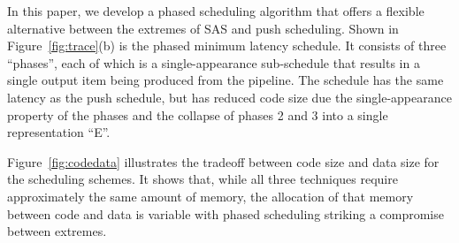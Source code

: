 In this paper, we develop a phased scheduling algorithm that offers a
flexible alternative between the extremes of SAS and push scheduling.
Shown in Figure~\ref{fig:trace}(b) is the phased minimum latency
schedule.  It consists of three ``phases'', each of which is a
single-appearance sub-schedule that results in a single output item
being produced from the pipeline.  The schedule has the same latency
as the push schedule, but has reduced code size due the
single-appearance property of the phases and the collapse of phases 2
and 3 into a single representation ``E''.

Figure~\ref{fig:codedata} illustrates the tradeoff between code size
and data size for the scheduling schemes.  It shows that, while all
three techniques require approximately the same amount of memory, the
allocation of that memory between code and data is variable with
phased scheduling striking a compromise between extremes.

\begin{comment}
We can compare the storage efficiency of these two schedules by
assuming that one data item in a buffer requires $x$ amount of memory
and each entry in a schedule requires $y$ amount of memory.  Thus the
two schedules will require the same amount of storage to store
themselves and execute if $11 x + 18 y = 39 x + 4 y$.

\begin{displaymath}
\begin{array}{rcl}
11 x + 18 y & = & 39 x + 4 y \\
14 y & = & 28 x \\
y & = & 2x
\end{array}
\end{displaymath}

Thus the smaller schedule is more efficient if every data item
requires less than twice the amount of storage than every entry in
the schedule.

One of the difficulties in scheduling {\StreamIt} programs lies in
finding a good set of trade-offs between schedule size and
buffering requirements.
\end{comment}

